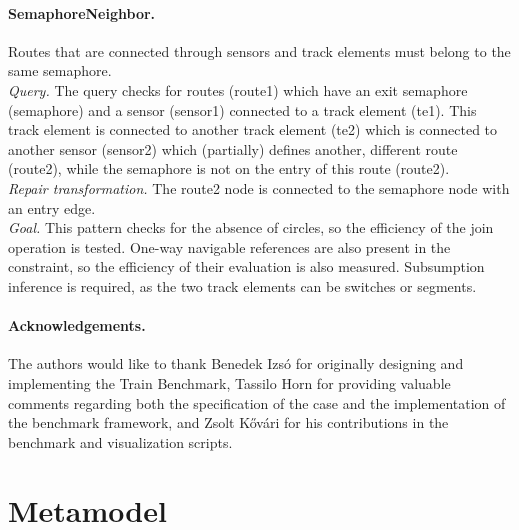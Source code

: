 \documentclass[submission,copyright,creativecommons]{eptcs}
\newcommand{\tb}{Train Benchmark\xspace}
\newcommand{\ttctransformation}[2]{
	\begin{figure}
		\centering
		\vspace{-1em}
		\texttt{[image: figures/transformation-\#1]}
		\vspace{-1em}
		\footnotesize
		\begin{align*}
		\sf #2
		\end{align*}
		\vspace{-3em}
	\end{figure}
}
\begin{document}
\paragraph{SemaphoreNeighbor.} Routes that are connected through sensors and track elements must belong to the same semaphore. \\
\textit{Query.} The query checks for routes (\textsf{route1}) which have an exit semaphore (\textsf{semaphore}) and a sensor (\textsf{sensor1}) connected to a track element (\textsf{te1}). This track element is connected to another track element (\textsf{te2}) which is connected to another sensor (\textsf{sensor2}) which (partially) defines another, different route (\textsf{route2}), while the semaphore is not on the entry of this route (\textsf{route2}). \\
\textit{Repair transformation.} The \textsf{route2} node is connected to the \textsf{semaphore} node with an \textsf{entry} edge. \\
\textit{Goal.} This pattern checks for the absence of circles, so the efficiency of the join operation is tested. One-way navigable references are also present in the constraint, so the efficiency of their evaluation is also measured. Subsumption inference is required, as the two track elements can be switches or segments.

\paragraph{Acknowledgements.} The authors would like to thank Benedek Izsó for originally designing and implementing the \tb, Tassilo Horn for providing valuable comments regarding both the specification of the case and the implementation of the benchmark framework, and Zsolt Kővári for his contributions in the benchmark and visualization scripts.




\clearpage

\appendix

\section{Metamodel}
\end{document}

